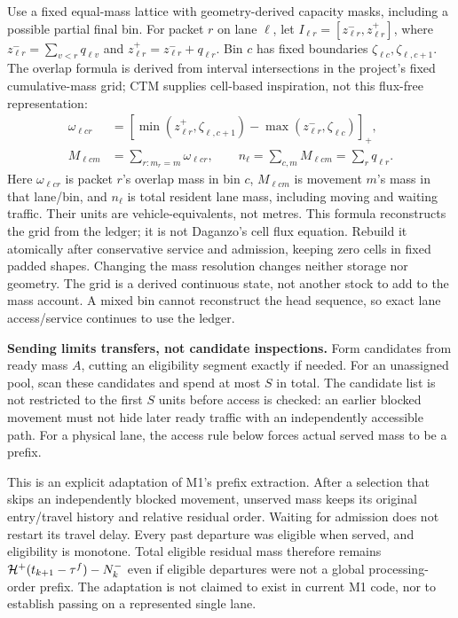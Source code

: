 \documentclass[10pt,a4paper]{article}
\newcommand{\rev}[1]{{\color{revisionred}#1}}
\begin{document}
Use a fixed equal-mass lattice with geometry-derived capacity masks,
including a possible partial final bin. For packet $r$ on lane $\ell$,
let $I_{\ell r}=[z^-_{\ell r},z^+_{\ell r}]$, where
$z^-_{\ell r}=\sum_{v<r}q_{\ell v}$ and
$z^+_{\ell r}=z^-_{\ell r}+q_{\ell r}$.
Bin $c$ has fixed boundaries $\zeta_{\ell c},\zeta_{\ell,c+1}$.
\rev{The overlap formula is derived from interval intersections in the project's fixed cumulative-mass grid; CTM supplies cell-based inspiration, not this flux-free representation:}
\begin{equation}
 \begin{aligned}
 \omega_{\ell cr}&=
 [\min(z^+_{\ell r},\zeta_{\ell,c+1})
           -\max(z^-_{\ell r},\zeta_{\ell c})]_+,\\
 M_{\ell cm}&=\sum_{r:m_r=m}\omega_{\ell cr},\qquad
 n_\ell=\sum_{c,m}M_{\ell cm}=\sum_rq_{\ell r}.
 \end{aligned}
 \label{eq:grid}
\end{equation}
Here $\omega_{\ell cr}$ is packet $r$'s overlap mass in bin $c$,
$M_{\ell cm}$ is movement $m$'s mass in that lane/bin, and $n_\ell$
is total resident lane mass, including moving and waiting traffic.
Their units are vehicle-equivalents, not metres.
This formula reconstructs the grid from the ledger; it is not Daganzo's
cell flux equation. Rebuild it atomically after conservative service and
admission, keeping zero cells in fixed padded shapes. Changing the mass
resolution changes neither storage nor geometry. The grid is a derived
continuous state, not another stock to add to the mass account. A mixed
bin cannot reconstruct the head sequence, so exact lane access/service
continues to use the ledger.
\par

\textbf{Sending limits transfers, not candidate inspections.}
Form candidates from ready mass $A$, cutting an eligibility segment
exactly if needed. For an unassigned pool, scan these candidates and
spend at most $S$ in total. The candidate list is not restricted to the first $S$ units before access
is checked: an earlier blocked movement must not hide later ready traffic
with an independently accessible path. For a physical lane, the access rule below forces
actual served mass to be a prefix.

This is an explicit adaptation of M1's prefix extraction. After a
selection that skips an independently blocked movement, unserved mass
keeps its original entry/travel history and relative residual order.
Waiting for admission does not restart its travel delay. Every past departure was eligible when served, and eligibility
is monotone. Total eligible residual mass therefore remains
${\cal H}^+(t_{k+1}-\tau^f)-N^-_k$ even if eligible departures were not
a global processing-order prefix. The adaptation is not claimed to exist
in current M1 code, nor to establish passing on a represented single lane.
\end{document}
